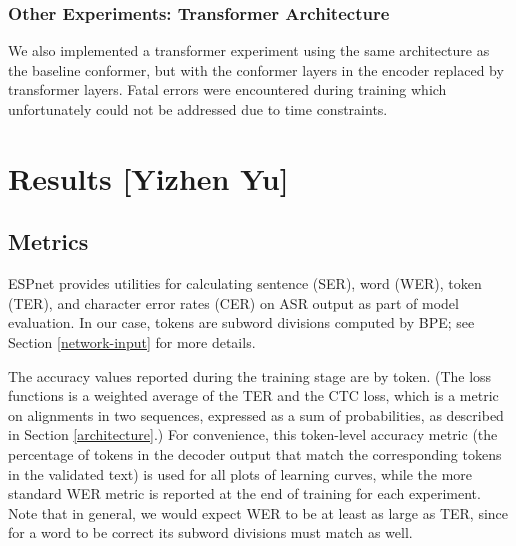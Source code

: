 \documentclass{article}
\begin{document}
  \subsubsection{Other Experiments: Transformer Architecture}
  We also implemented a transformer experiment using the same architecture as the baseline conformer, but with the conformer layers in the encoder replaced by transformer layers. Fatal errors were encountered during training which unfortunately could not be addressed due to time constraints.
  \section{Results [Yizhen Yu]} \label{results}
  \subsection{Metrics} \label{metrics}
  ESPnet provides utilities for calculating sentence (SER), word (WER), token (TER), and character error rates (CER) on ASR output as part of model evaluation. In our case, tokens are subword divisions computed by BPE; see Section \ref{network-input} for more details.

  The accuracy values reported during the training stage are by token. (The loss functions is a weighted average of the TER and the CTC loss, which is a metric on alignments in two sequences, expressed as a sum of probabilities, as described in Section \ref{architecture}.) For convenience, this token-level accuracy metric (the percentage of tokens in the decoder output that match the corresponding tokens in the validated text) is used for all plots of learning curves, while the more standard WER metric is reported at the end of training for each experiment. Note that in general, we would expect WER to be at least as large as TER, since for a word to be correct its subword divisions must match as well.
\end{document}
